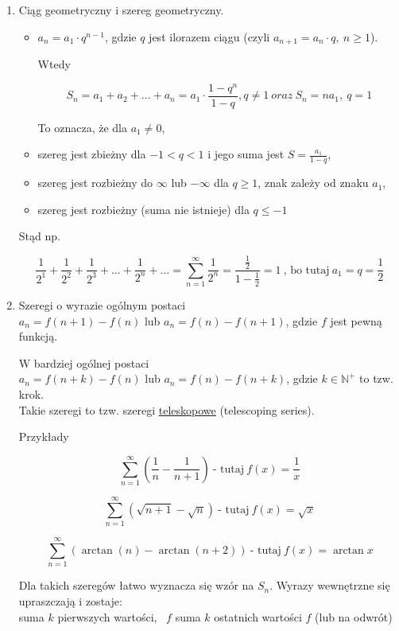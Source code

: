 \documentclass[12pt]{article}
\begin{document}
\begin{enumerate}
    \item Ciąg geometryczny i szereg geometryczny.
    \begin{itemize}
        \item 
        $ a_n = a_1 \cdot q^{n-1} $, gdzie $q$ jest ilorazem ciągu (czyli $a_{n+1} = a_n \cdot q , \ n \geq 1$).
        
        Wtedy

        $$ S_n = a_1 + a_2 + ... + a_n = a_1 \cdot \frac{1 - q^n}{1 - q}, q \neq 1 \ oraz \ S_n = na_1, \ q = 1 $$

        To oznacza, że dla $ a_1 \neq 0 $,

        \item szereg jest zbieżny dla $ -1 < q < 1 $ i jego suma jest $ S = \frac{a_1}{1 - q} $,
        \item szereg jest rozbieżny do $\infty$ lub $-\infty$ dla $ q \geq 1 $, znak zależy od znaku $a_1$,
        \item szereg jest rozbieżny (suma nie istnieje) dla $ q \leq -1 $ \\
    \end{itemize}

    Stąd np.

    $$ \frac{1}{2^1} + \frac{1}{2^2} + \frac{1}{2^3} + ... + \frac{1}{2^n} + ... = \sum\limits_{n = 1}^{\infty} \frac{1}{2^n} =
    \frac{ \frac{1}{2} }{ 1 - \frac{1}{2} } = 1 \ \textrm{, bo tutaj} \ a_1 = q = \frac{1}{2} $$

    \item Szeregi o wyrazie ogólnym postaci \\
    $ a_n = f(n + 1) - f(n)$ lub $ a_n = f(n) - f(n + 1) $, gdzie $f$ jest pewną funkcją.

    W bardziej ogólnej postaci \\
    \quad $ a_n = f(n + k) - f(n) $ lub $ a_n = f(n) - f(n + k) $, gdzie $ k \in \mathbb{N}^+ $ to tzw. krok. \\
    
    Takie szeregi to tzw. szeregi \underline{teleskopowe} (telescoping series).

    Przykłady

    $$ \sum\limits_{n = 1}^{\infty} \left( \frac{1}{n} - \frac{1}{n + 1} \right) \ \textrm{- tutaj} \ f(x) = \frac{1}{x} $$

    $$ \sum\limits_{n = 1}^{\infty} \left( \sqrt{n + 1} - \sqrt{n} \right) \ \textrm{- tutaj} \ f(x) = \sqrt{x} $$

    $$ \sum\limits_{n = 1}^{\infty} \left( \arctan(n) - \arctan(n+2) \right) \ \textrm{- tutaj} \ f(x) = \arctan x $$

    Dla takich szeregów łatwo wyznacza się wzór na $S_n$. Wyrazy wewnętrzne się upraszczają i zostaje: \\
    suma $k$ pierwszych wartości, \ $f$ suma $k$ ostatnich wartości $f$ (lub na odwrót) \\

\end{enumerate}
\end{document}
